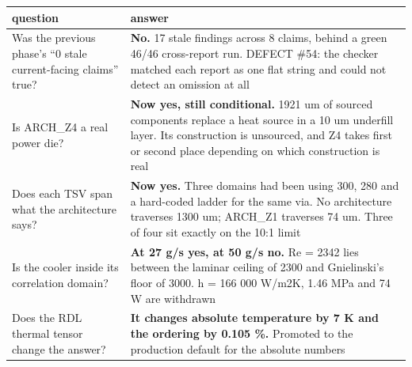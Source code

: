 \documentclass[10pt,]{article}
\begin{document}
\begin{longtable}[]{@{}ll@{}}
\toprule
\begin{minipage}[b]{0.47\columnwidth}\raggedright
question\strut
\end{minipage} & \begin{minipage}[b]{0.47\columnwidth}\raggedright
answer\strut
\end{minipage}\tabularnewline
\midrule
\endhead
\begin{minipage}[t]{0.47\columnwidth}\raggedright
Was the previous phase's ``0 stale current-facing claims'' true?\strut
\end{minipage} & \begin{minipage}[t]{0.47\columnwidth}\raggedright
\textbf{No.} 17 stale findings across 8 claims, behind a green 46/46
cross-report run. DEFECT \#54: the checker matched each report as one
flat string and could not detect an omission at all\strut
\end{minipage}\tabularnewline
\begin{minipage}[t]{0.47\columnwidth}\raggedright
Is ARCH\_Z4 a real power die?\strut
\end{minipage} & \begin{minipage}[t]{0.47\columnwidth}\raggedright
\textbf{Now yes, still conditional.} 1921 um of sourced components
replace a heat source in a 10 um underfill layer. Its construction is
unsourced, and Z4 takes first or second place depending on which
construction is real\strut
\end{minipage}\tabularnewline
\begin{minipage}[t]{0.47\columnwidth}\raggedright
Does each TSV span what the architecture says?\strut
\end{minipage} & \begin{minipage}[t]{0.47\columnwidth}\raggedright
\textbf{Now yes.} Three domains had been using 300, 280 and a hard-coded
ladder for the same via. No architecture traverses 1300 um; ARCH\_Z1
traverses 74 um. Three of four sit exactly on the 10:1 limit\strut
\end{minipage}\tabularnewline
\begin{minipage}[t]{0.47\columnwidth}\raggedright
Is the cooler inside its correlation domain?\strut
\end{minipage} & \begin{minipage}[t]{0.47\columnwidth}\raggedright
\textbf{At 27 g/s yes, at 50 g/s no.} Re = 2342 lies between the laminar
ceiling of 2300 and Gnielinski's floor of 3000. h = 166 000 W/m2K, 1.46
MPa and 74 W are withdrawn\strut
\end{minipage}\tabularnewline
\begin{minipage}[t]{0.47\columnwidth}\raggedright
Does the RDL thermal tensor change the answer?\strut
\end{minipage} & \begin{minipage}[t]{0.47\columnwidth}\raggedright
\textbf{It changes absolute temperature by 7 K and the ordering by 0.105
\%.} Promoted to the production default for the absolute numbers\strut
\end{minipage}\tabularnewline
\bottomrule
\end{longtable}
\end{document}
